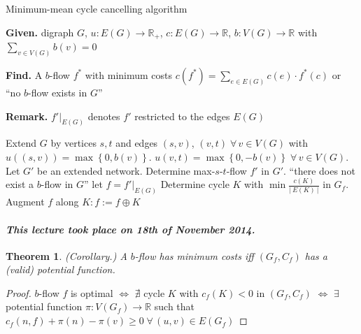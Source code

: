 \documentclass{article}
\newtheorem{theorem}{Theorem}
\newcommand{\card}[1]{\left|\:\!#1\:\!\right|}
\newcommand{\set}[1]{\left\{#1\right\}}
\newcommand{\given}[1]{\textbf{Given.} #1\par}
\newcommand{\find}[1]{\textbf{Find.} #1\par}
\newcommand{\dateref}[1]{\paragraph{\textit{This lecture took place on #1.}}}
\newcommand{\fall}{\;\forall\,}
\begin{document}
\begin{algorithm}
  \caption{Minimum-mean cycle cancelling algorithm}
  \label{minimum-mean-cancelling-algo}
  \given{digraph $G$, $u: E(G) \rightarrow \mathbb{R}_+$, $c: E(G) \rightarrow \mathbb{R}$, $b: V(G) \rightarrow \mathbb{R}$ with $\sum_{v \in V(G)} b(v) = 0$}
  \find{A $b$-flow $f^*$ with minimum costs $c(f^*) = \sum_{e \in E(G)} c(e) \cdot f^*(c)$ or ``no $b$-flow exists in $G$''}
  \textbf{Remark.} $f'|_{E(G)}$ denotes $f'$ restricted to the edges $E(G)$ \par
\begin{algorithmic}[1]
  \State Extend $G$ by vertices $s,t$ and edges $(s, v)$, $(v, t) \fall v \in V(G)$ with $u((s,v)) = \max\set{0,b(v)}$. $u(v, t) = \max\set{0, -b(v)} \fall v \in V(G)$. Let $G'$ be an extended network. Determine max-$s$-$t$-flow $f'$ in $G'$.
    \State ``there does not exist a $b$-flow in $G$''
  \Else
    \State let $f = f'|_{E(G)}$
  \EndIf
    \State Determine cycle $K$ with $\min\frac{c(K)}{\card{E(K)}}$ in $G_f$.
    \State Augment $f$ along $K: f := f \oplus K$
  \EndWhile
  \State {}
\end{algorithmic}
\end{algorithm}

\dateref{18th of November 2014}

\begin{theorem}
  (Corollary.)
  A $b$-flow has minimum costs iff $(G_f, C_f)$ has a (valid) potential function.
\end{theorem}
\begin{proof}
  $b$-flow $f$ is optimal $\Leftrightarrow$ $\nexists$ cycle $K$ with $c_f(K) < 0$ in $(G_f, C_f)$
  $\Leftrightarrow$ $\exists$ potential function $\pi: V(G_f) \rightarrow \mathbb{R}$ such that $c_f(n,f) + \pi(n) - \pi(v) \geq 0 \fall (u,v) \in E(G_f)$
\end{proof}
\end{document}
